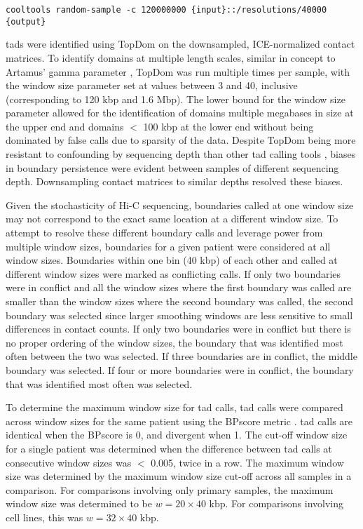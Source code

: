 \begin{lstlisting}[basicstyle=\ttfamily]
cooltools random-sample -c 120000000 {input}::/resolutions/40000 {output}
\end{lstlisting}

\glspl{tad} were identified using TopDom \cite{shinTopDomEfficientDeterministic2016} on the downsampled, ICE-normalized contact matrices.
To identify domains at multiple length scales, similar in concept to Artamus' gamma parameter \cite{filippovaIdentificationAlternativeTopological2014}, TopDom was run multiple times per sample, with the window size parameter set at values between 3 and 40, inclusive (corresponding to 120 kbp and 1.6 Mbp).
The lower bound for the window size parameter allowed for the identification of domains multiple megabases in size at the upper end and domains $<$ 100 kbp at the lower end without being dominated by false calls due to sparsity of the data.
Despite TopDom being more resistant to confounding by sequencing depth than other \gls{tad} calling tools \cite{forcatoComparisonComputationalMethods2017}, biases in boundary persistence were evident between samples of different sequencing depth.
Downsampling contact matrices to similar depths resolved these biases.

Given the stochasticity of Hi-C sequencing, boundaries called at one window size may not correspond to the exact same location at a different window size.
To attempt to resolve these different boundary calls and leverage power from multiple window sizes, boundaries for a given patient were considered at all window sizes.
Boundaries within one bin (40 kbp) of each other and called at different window sizes were marked as conflicting calls.
If only two boundaries were in conflict and all the window sizes where the first boundary was called are smaller than the window sizes where the second boundary was called, the second boundary was selected since larger smoothing windows are less sensitive to small differences in contact counts.
If only two boundaries were in conflict but there is no proper ordering of the window sizes, the boundary that was identified most often between the two was selected.
If three boundaries are in conflict, the middle boundary was selected.
If four or more boundaries were in conflict, the boundary that was identified most often was selected.

To determine the maximum window size for \gls{tad} calls, \gls{tad} calls were compared across window sizes for the same patient using the BPscore metric \cite{zaborowskiBPscoreEffectiveMetric2019}.
\gls{tad} calls are identical when the BPscore is 0, and divergent when 1.
The cut-off window size for a single patient was determined when the difference between \gls{tad} calls at consecutive window sizes was $<$ 0.005, twice in a row.
The maximum window size was determined by the maximum window size cut-off across all samples in a comparison.
For comparisons involving only primary samples, the maximum window size was determined to be $w = 20 \times 40 \text{ kbp}$.
For comparisons involving cell lines, this was $w = 32 \times 40 \text{ kbp}$.

